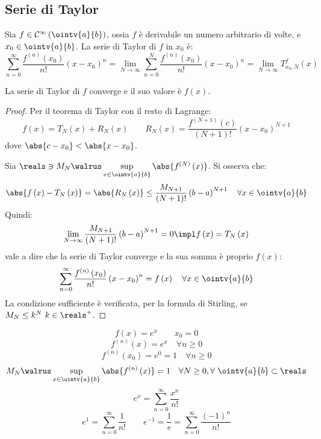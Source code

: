 \subsection{Serie di Taylor}

\begin{definition}
  Sia $f\in \mathcal{C}^\infty\left( \ointv{a}{b} \right)$, ossia $f$ è derivabile un numero arbitrario di volte, e $x_0\in\ointv{a}{b}$.
  La serie di Taylor di $f$ in $x_0$ è:
  $$\sum_{n=0}^\infty\frac{f^{\left( n \right)}\left( x_0 \right)}{n!}\left( x-x_0 \right)^n=\lim_{N\to\infty}\sum_{n=0}^N\frac{f^{\left( n \right)}\left( x_0 \right)}{n!}\left( x-x_0 \right)^n=\lim_{N\to\infty}T_{x_0,N}^f\left( x \right)$$
\end{definition}
\begin{observation}
  La serie di Taylor di $f$ converge e il suo valore è $f\left( x \right)$.
\end{observation}
\begin{proof}
  Per il teorema di Taylor con il resto di Lagrange:
  $$f\left( x \right)=T_N\left( x \right)+R_N\left( x \right)\qquad R_N\left( x \right)=\frac{f^{\left( N+1 \right)}\left( c \right)}{\left( N+1 \right)!}\left( x-x_0 \right)^{N+1}$$
  dove $\abs{c-x_0}<\abs{x-x_0}$.
  
  Sia $\reals \ni M_N\walrus \sup\limits_{x\in\ointv{a}{b}} \abs{f^{\left( N \right)}\left( x \right)}$. Si osserva che:
  $$\abs{f\left( x \right)-T_N\left( x \right)}=\abs{R_N\left( x \right)}\le\frac{M_{N+1}}{\left( N+1 \right)!}\left( b-a \right)^{N+1}\quad \forall x\in\ointv{a}{b}$$
  Quindi:
  $$\lim_{N\to\infty}\frac{M_{N+1}}{\left( N+1 \right)!}\left( b-a \right)^{N+1}=0\impl f\left( x \right)=T_N\left( x \right)$$
  vale a dire che la serie di Taylor converge e la sua somma è proprio $f\left( x \right)$:
  $$\sum_{n=0}^\infty\frac{f^{\left( n \right)}\left( x_0 \right)}{n!}\left( x-x_0 \right)^n=f\left( x \right)\quad \forall x\in\ointv{a}{b}$$
  La condizione sufficiente è verificata, per la formula di Stirling, se $M_N\le k^N\ k\in\reals^+$.
\end{proof}

\begin{example}
  $$f\left( x \right)=e^x\qquad x_0=0$$
  $$f^{\left( n \right)}\left( x \right)=e^x\quad \forall n\ge0$$
  $$f^{\left( n \right)}\left( x_0 \right)=e^0=1\quad \forall n\ge0$$
  $$M_N\walrus \sup_{x\in\ointv{a}{b}}\abs{f^{\left( n \right)}\left( x \right)}=1\quad \forall N\ge0,\forall\ \ointv{a}{b}\subset\reals$$
  $$e^x=\sum_{n=0}^\infty\frac{x^n}{n!}$$
  $$e^1=\sum_{n=0}^\infty\frac{1}{n!}\qquad e^{-1}=\frac{1}{e}=\sum_{n=0}^\infty\frac{\left( -1 \right)^n}{n!}$$
\end{example}

